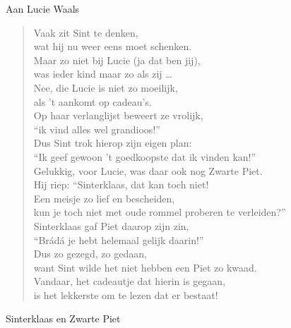 \documentclass[12pt]{brief}
\date{4 december 2004}
\begin{document}
\begin{letter}{Aan Lucie Waals}

\opening{}


\begin{verse}

Vaak zit Sint te denken,\\
wat hij nu weer eens moet schenken.\\
Maar zo niet bij Lucie (ja dat ben jij),\\
was ieder kind maar zo als zij \ldots \\[0.5em]

Nee, die Lucie is niet zo moeilijk,\\
als 't aankomt op cadeau's.\\
Op haar verlanglijst beweert ze vrolijk,\\
``ik vind alles wel grandioos!''\\[0.5em]

Dus Sint trok hierop zijn eigen plan:\\
``Ik geef gewoon 't goedkoopste dat ik vinden kan!''\\[0.5em]

Gelukkig, voor Lucie, was daar ook nog Zwarte Piet.\\
Hij riep: ``Sinterklaas, dat kan toch niet!\\
Een meisje zo lief en bescheiden,\\
kun je toch niet met oude rommel proberen te verleiden?''\\[0.5em]

Sinterklaas gaf Piet daarop zijn zin,\\
``Br\'ad\'a je hebt helemaal gelijk daarin!''\\[0.5em]

Dus zo gezegd, zo gedaan,\\
want Sint wilde het niet hebben een Piet zo kwaad.\\
Vandaar, het cadeautje dat hierin is gegaan,\\
is het lekkerste om te lezen dat er bestaat!\\[2em]

\end{verse}


Sinterklaas en Zwarte Piet


\closing{}

\end{letter}
\end{document}
